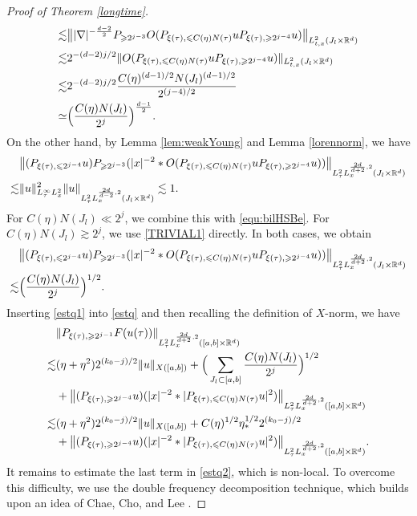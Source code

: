 \documentclass[reqno,11pt]{amsart}
\theoremstyle{plain}
\theoremstyle{definition}
\numberwithin{equation}{section}
\numberwithin{theorem}{section}
\def\geq{\geqslant}
\def\leq{\leqslant}
\def\R{\mathbb{R}}
\begin{document}
\begin{proof}[Proof of Theorem \ref{longtime}]
\begin{align}
\lesssim&\big\||\nabla|^{-\frac{d-2}2}P_{\geq 2^{j-3}} O(P_{\xi(\tau),\leq C(\eta)N(\tau)}uP_{\xi(\tau),\geq 2^{j-4}}u)\big\|_{L_{t,x}^2(J_l\times\R^d)}  \\
\lesssim& 2^{-(d-2)j/2}\|O(P_{\xi(\tau),\leq C(\eta)N(\tau)}uP_{\xi(\tau),\geq 2^{j-4}}u)\|_{L_{t,x}^2(J_l\times\R^d)}\notag\\\notag
\lesssim&2^{-(d-2)j/2} \frac{C(\eta)^{(d-1)/2}N(J_l)^{(d-1)/2}}{2^{(j-4)/2}}\\\label{equ:bilHSBe}
\simeq&\Big(\frac{C(\eta)N(J_l)}{2^j}\Big)^{\frac{d-1}2}.
\end{align}
On the other hand, by Lemma \ref{lem:weakYoung}  and Lemma \ref{lorennorm}, we have
\begin{align}\label{TRIVIAL1}
&\big\|(P_{\xi(\tau),\leq 2^{j-4}}u)P_{\geq 2^{j-3}}(|x|^{-2}\ast O(P_{\xi(\tau),\leq C(\eta)N(\tau)}uP_{\xi(\tau),\geq 2^{j-4}}u))\big\|_{L_{\tau}^2L_x^{\frac{2d}{d+2},2}(J_l\times\R^d)}\notag\\
\lesssim&\|u\|^2_{L_{\tau}^{\infty}L_x^2}\|u\|_{L_{\tau}^{2}L_x^{\frac{2d}{d-2},2}(J_l\times\R^d)}\lesssim 1.
\end{align}
For $C(\eta)N(J_l)\ll2^j$, we combine this with \eqref{equ:bilHSBe}.
For $C(\eta)N(J_l)\gtrsim2^j$, we use \eqref{TRIVIAL1} directly. In both
cases, we obtain
\begin{align}\label{estq1}
&\big\|(P_{\xi(\tau),\leq 2^{j-4}}u)P_{\geq 2^{j-3}}(|x|^{-2}\ast O(P_{\xi(\tau),\leq C(\eta)N(\tau)}uP_{\xi(\tau),\geq 2^{j-4}}u))\big\|_{L_{\tau}^2L_x^{\frac{2d}{d+2},2}(J_l\times\R^d)}\notag\\
\lesssim& \Big(\frac{C(\eta)N(J_l)}{2^j}\Big)^{1/2}.
\end{align}
Inserting \eqref{estq1} into \eqref{estq} and then recalling the definition of $X$-norm, we have
\begin{align}\notag
&\|P_{\xi(\tau),\geq 2^{j-1}}F(u(\tau))\|_{L_{\tau}^2L_x^{\frac{2d}{d+2},2}([a,b]\times\R^d)}\\\notag
\lesssim& (\eta+\eta^2)2^{(k_0-j)/2}\|u\|_{X([a,b])}
+\Big(\sum_{J_l\subset[a,b]}\frac{C(\eta)N(J_l)}{2^j}\Big)^{1/2}\\
&+\big\|(P_{\xi(\tau),\geq 2^{j-4}}u)(|x|^{-2}\ast|P_{\xi(\tau),\leq C(\eta)N(\tau)}u|^2)\big\|_{L_{\tau}^2L_x^{\frac{2d}{d+2},2}([a,b]\times\R^d)} \notag\\
\lesssim& (\eta+\eta^2)2^{(k_0-j)/2}\|u\|_{X([a,b])} +C(\eta)^{1/2}\eta_{\ast}^{1/2}2^{(k_0-j)/2}\notag\\
&+\big\|(P_{\xi(\tau),\geq 2^{j-4}}u)(|x|^{-2}\ast|P_{\xi(\tau),\leq C(\eta)N(\tau)}u|^2)\big\|_{L_{\tau}^2L_x^{\frac{2d}{d+2},2}([a,b]\times\R^d)}.\label{estq2}
\end{align}
It remains to estimate the last term in \eqref{estq2}, which is non-local. To overcome this difficulty,  we use the double frequency decomposition technique, which builds upon an idea of Chae, Cho, and Lee \cite{CCS}.


\end{proof}
\end{document}
